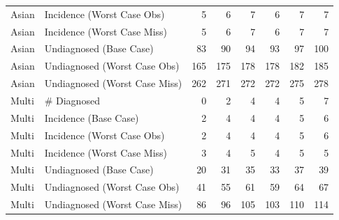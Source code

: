\documentclass{article}\usepackage[]{graphicx}\usepackage[]{color}
\begin{document}
\begin{table}[ht]
{\begin{tabular}{llrrrrrr}
  Asian & Incidence (Worst Case Obs) & 5 & 6 & 7 & 6 & 7 & 7 \\ 
  Asian & Incidence (Worst Case Miss) & 5 & 6 & 7 & 6 & 7 & 7 \\ 
  Asian & Undiagnosed (Base Case) & 83 & 90 & 94 & 93 & 97 & 100 \\ 
  Asian & Undiagnosed (Worst Case Obs) & 165 & 175 & 178 & 178 & 182 & 185 \\ 
  Asian & Undiagnosed (Worst Case Miss) & 262 & 271 & 272 & 272 & 275 & 278 \\ 
  Multi & \# Diagnosed & 0 & 2 & 4 & 4 & 5 & 7 \\ 
  Multi & Incidence (Base Case) & 2 & 4 & 4 & 4 & 5 & 6 \\ 
  Multi & Incidence (Worst Case Obs) & 2 & 4 & 4 & 4 & 5 & 6 \\ 
  Multi & Incidence (Worst Case Miss) & 3 & 4 & 5 & 4 & 5 & 5 \\ 
  Multi & Undiagnosed (Base Case) & 20 & 31 & 35 & 33 & 37 & 39 \\ 
  Multi & Undiagnosed (Worst Case Obs) & 41 & 55 & 61 & 59 & 64 & 67 \\ 
  Multi & Undiagnosed (Worst Case Miss) & 86 & 96 & 105 & 103 & 110 & 114 \\ 
   \hline
\end{tabular}
}
\end{table}
\end{document}

